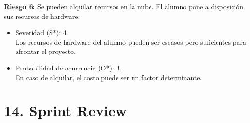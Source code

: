 \documentclass[
11pt, %
]{charter}
\begin{document}
\textbf{Riesgo 6:} Se pueden alquilar recursos en la nube. El alumno pone a disposición sus recursos de hardware.
  \begin{itemize}
	\item Severidad (S*): 4. \\
          Los recursos de hardware del alumno pueden ser escasos pero suficientes para afrontar el proyecto.
	\item Probabilidad de ocurrencia (O*): 3. \\
          En caso de alquilar, el costo puede ser un factor determinante.
	\end{itemize}

\newpage
\section{14. Sprint Review}
\label{sec:sprint_review}
\end{document}
